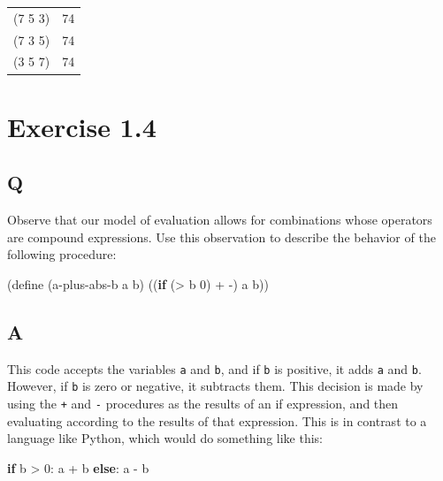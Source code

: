 \documentclass[
]{article}
\newenvironment{Shaded}{}{}
\newcommand{\ControlFlowTok}[1]{\textcolor[rgb]{0.00,0.44,0.13}{\textbf{#1}}}
\newcommand{\DecValTok}[1]{\textcolor[rgb]{0.25,0.63,0.44}{#1}}
\newcommand{\ExtensionTok}[1]{#1}
\newcommand{\FunctionTok}[1]{\textcolor[rgb]{0.02,0.16,0.49}{#1}}
\newcommand{\KeywordTok}[1]{\textcolor[rgb]{0.00,0.44,0.13}{\textbf{#1}}}
\newcommand{\NormalTok}[1]{#1}
\newcommand{\OperatorTok}[1]{\textcolor[rgb]{0.40,0.40,0.40}{#1}}
\begin{document}
\begin{longtable}[]{@{}ll@{}}
\toprule
\endhead
(7 5 3) & 74 \\
(7 3 5) & 74 \\
(3 5 7) & 74 \\
\bottomrule
\end{longtable}

\hypertarget{exercise-1.4}{%
\section{Exercise 1.4}\label{exercise-1.4}}

\hypertarget{q-3}{%
\subsection{Q}\label{q-3}}

Observe that our model of evaluation allows for combinations whose
operators are compound expressions. Use this observation to describe the
behavior of the following procedure:

\hypertarget{a-plus-abs-b}{%
\label{a-plus-abs-b}}%
\begin{Shaded}
\begin{Highlighting}[numbers=left,,]
\NormalTok{(}\ExtensionTok{define}\FunctionTok{ }\NormalTok{(a{-}plus{-}abs{-}b a b)}
\NormalTok{  ((}\KeywordTok{if}\NormalTok{ (}\OperatorTok{\textgreater{}}\NormalTok{ b }\DecValTok{0}\NormalTok{) }\OperatorTok{+} \OperatorTok{{-}}\NormalTok{) a b))}
\end{Highlighting}
\end{Shaded}

\hypertarget{a-3}{%
\subsection{A}\label{a-3}}

This code accepts the variables \texttt{a} and \texttt{b}, and if
\texttt{b} is positive, it adds \texttt{a} and \texttt{b}. However, if
\texttt{b} is zero or negative, it subtracts them. This decision is made
by using the \texttt{+} and \texttt{-} procedures as the results of an
if expression, and then evaluating according to the results of that
expression. This is in contrast to a language like Python, which would
do something like this:

\begin{Shaded}
\begin{Highlighting}[]
\ControlFlowTok{if}\NormalTok{ b }\OperatorTok{\textgreater{}} \DecValTok{0}\NormalTok{: a }\OperatorTok{+}\NormalTok{ b}
\ControlFlowTok{else}\NormalTok{: a }\OperatorTok{{-}}\NormalTok{ b}
\end{Highlighting}
\end{Shaded}
\end{document}
